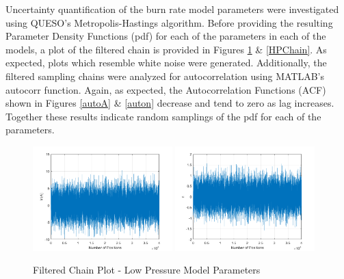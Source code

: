 \documentclass{article}
\begin{document}
Uncertainty quantification of the burn rate model parameters were investigated using QUESO's Metropolis-Hastings
algorithm. Before providing the resulting Parameter Density Functions (pdf) for each of the parameters in each of 
the models, a plot of the filtered chain is provided in Figures \ref{LPChain} \& \ref{HPChain}. As expected, 
plots which resemble white noise were generated. Additionally, the filtered sampling chains were analyzed for
autocorrelation using MATLAB's autocorr function. Again, as expected, the Autocorrelation Functions (ACF) shown in
Figures \ref{autoA} \& \ref{auton} decrease and tend to zero as lag increases. Together these results indicate
random samplings of the pdf for each of the parameters.

\begin{figure}[htb]
\centering
\includegraphics[width=0.48\textwidth]{FilteredChain_lnA_LP.png}
\includegraphics[width=0.48\textwidth]{FilteredChain_n_LP.png}
\caption{Filtered Chain Plot - Low Pressure Model Parameters}
\label{LPChain}
\end{figure}
\end{document}
